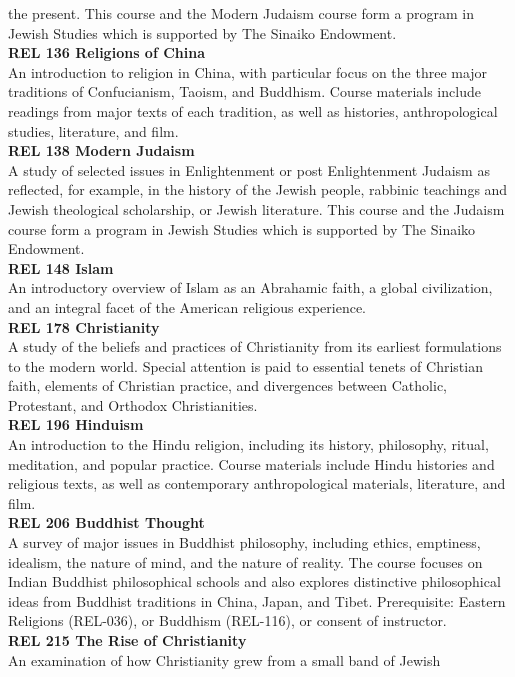 \documentclass[
  letterpaper,
]{scrbook}
\begin{document}
the present. This course and the Modern Judaism course form a program in
Jewish Studies which is supported by The Sinaiko Endowment.\\
\textbf{REL 136 Religions of China}\\
An introduction to religion in China, with particular focus on the three
major traditions of Confucianism, Taoism, and Buddhism. Course materials
include readings from major texts of each tradition, as well as
histories, anthropological studies, literature, and film.\\
\textbf{REL 138 Modern Judaism}\\
A study of selected issues in Enlightenment or post Enlightenment
Judaism as reflected, for example, in the history of the Jewish people,
rabbinic teachings and Jewish theological scholarship, or Jewish
literature. This course and the Judaism course form a program in Jewish
Studies which is supported by The Sinaiko Endowment.\\
\textbf{REL 148 Islam}\\
An introductory overview of Islam as an Abrahamic faith, a global
civilization, and an integral facet of the American religious
experience.\\
\textbf{REL 178 Christianity}\\
A study of the beliefs and practices of Christianity from its earliest
formulations to the modern world. Special attention is paid to essential
tenets of Christian faith, elements of Christian practice, and
divergences between Catholic, Protestant, and Orthodox Christianities.\\
\textbf{REL 196 Hinduism}\\
An introduction to the Hindu religion, including its history,
philosophy, ritual, meditation, and popular practice. Course materials
include Hindu histories and religious texts, as well as contemporary
anthropological materials, literature, and film.\\
\textbf{REL 206 Buddhist Thought}\\
A survey of major issues in Buddhist philosophy, including ethics,
emptiness, idealism, the nature of mind, and the nature of reality. The
course focuses on Indian Buddhist philosophical schools and also
explores distinctive philosophical ideas from Buddhist traditions in
China, Japan, and Tibet. Prerequisite: Eastern Religions (REL-036), or
Buddhism (REL-116), or consent of instructor.\\
\textbf{REL 215 The Rise of Christianity}\\
An examination of how Christianity grew from a small band of Jewish
\end{document}
